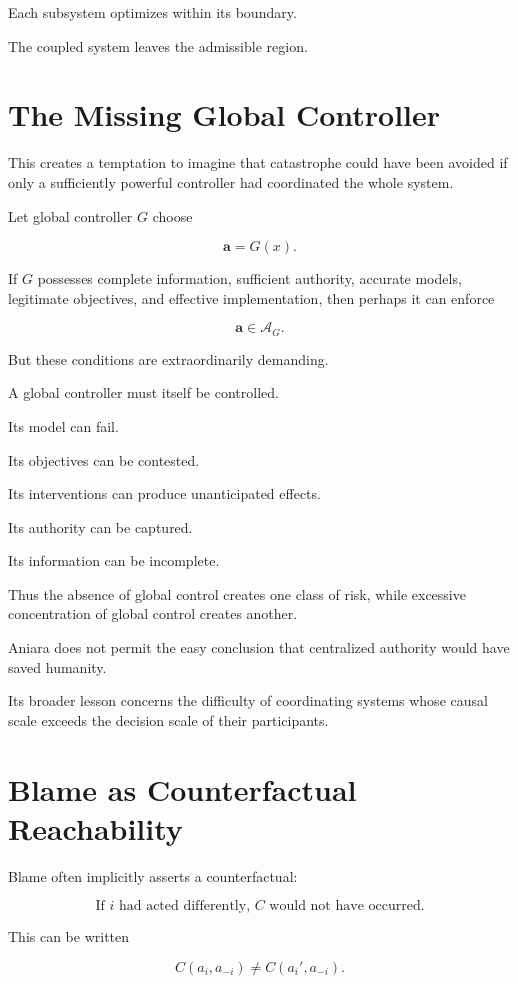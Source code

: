 \documentclass[11pt,oneside]{book}
\theoremstyle{definition}
\theoremstyle{remark}
\newcommand{\A}{\mathcal{A}}
\begin{document}
Each subsystem optimizes within its boundary.

The coupled system leaves the admissible region.

\section{The Missing Global Controller}

This creates a temptation to imagine that catastrophe could have been avoided if only a sufficiently powerful controller had coordinated the whole system.

Let global controller \(G\) choose

\[
\mathbf a
=
G(x).
\]

If \(G\) possesses complete information, sufficient authority, accurate models, legitimate objectives, and effective implementation, then perhaps it can enforce

\[
\mathbf a\in\A_G.
\]

But these conditions are extraordinarily demanding.

A global controller must itself be controlled.

Its model can fail.

Its objectives can be contested.

Its interventions can produce unanticipated effects.

Its authority can be captured.

Its information can be incomplete.

Thus the absence of global control creates one class of risk, while excessive concentration of global control creates another.

Aniara does not permit the easy conclusion that centralized authority would have saved humanity.

Its broader lesson concerns the difficulty of coordinating systems whose causal scale exceeds the decision scale of their participants.

\section{Blame as Counterfactual Reachability}

Blame often implicitly asserts a counterfactual:

\[
\text{If }i\text{ had acted differently, }C\text{ would not have occurred.}
\]

This can be written

\[
C(a_i,a_{-i})
\neq
C(a_i',a_{-i}).
\]
\end{document}
